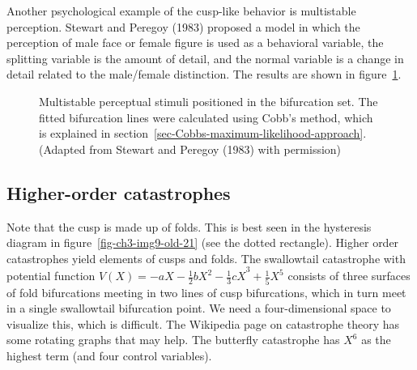 \documentclass[
  a4paper,
  DIV=11,
  numbers=noendperiod,
  oneside]{scrreprt}
\begin{document}
Another psychological example of the cusp-like behavior is multistable
perception. Stewart and Peregoy (1983) proposed a model in which the
perception of male face or female figure is used as a behavioral
variable, the splitting variable is the amount of detail, and the normal
variable is a change in detail related to the male/female distinction.
The results are shown in figure~\ref{fig-ch3-img14-old-26}.

\begin{figure}


\caption{\label{fig-ch3-img14-old-26}Multistable perceptual stimuli
positioned in the bifurcation set. The fitted bifurcation lines were
calculated using Cobb's method, which is explained in
section~\ref{sec-Cobbs-maximum-likelihood-approach}. (Adapted from
Stewart and Peregoy (1983) with permission)}

\end{figure}%

\subsection{Higher-order
catastrophes}\label{sec-Higher-order-catastrophes}

Note that the cusp is made up of folds. This is best seen in the
hysteresis diagram in figure~\ref{fig-ch3-img9-old-21} (see the dotted
rectangle). Higher order catastrophes yield elements of cusps and folds.
The swallowtail catastrophe with potential function
\(V(X) = {- aX - \frac{1}{2}bX^{2} - \frac{1}{3}cX}^{3} + \frac{1}{5}X^{5}\)
consists of three surfaces of fold bifurcations meeting in two lines of
cusp bifurcations, which in turn meet in a single swallowtail
bifurcation point. We need a four-dimensional space to visualize this,
which is difficult. The Wikipedia page on catastrophe theory has some
rotating graphs that may help. The butterfly catastrophe has \(X^{6}\)
as the highest term (and four control variables).
\end{document}
